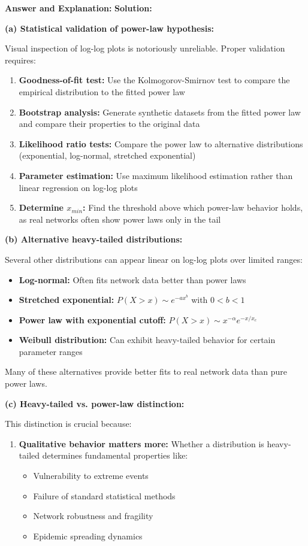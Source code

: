 \documentclass[11pt]{article}
\newenvironment{answer}{\color{answercolor}\begin{framed}\textbf{Answer and Explanation:}}{\end{framed}}
\begin{document}
\begin{answer}
\textbf{Solution:}

\textbf{(a) Statistical validation of power-law hypothesis:}

Visual inspection of log-log plots is notoriously unreliable. Proper validation requires:

\begin{enumerate}
    \item \textbf{Goodness-of-fit test:} Use the Kolmogorov-Smirnov test to compare the empirical distribution to the fitted power law
    \item \textbf{Bootstrap analysis:} Generate synthetic datasets from the fitted power law and compare their properties to the original data
    \item \textbf{Likelihood ratio tests:} Compare the power law to alternative distributions (exponential, log-normal, stretched exponential)
    \item \textbf{Parameter estimation:} Use maximum likelihood estimation rather than linear regression on log-log plots
    \item \textbf{Determine $x_{min}$:} Find the threshold above which power-law behavior holds, as real networks often show power laws only in the tail
\end{enumerate}

\textbf{(b) Alternative heavy-tailed distributions:}

Several other distributions can appear linear on log-log plots over limited ranges:
\begin{itemize}
    \item \textbf{Log-normal:} Often fits network data better than power laws
    \item \textbf{Stretched exponential:} $P(X > x) \sim e^{-ax^b}$ with $0 < b < 1$
    \item \textbf{Power law with exponential cutoff:} $P(X > x) \sim x^{-\alpha}e^{-x/x_c}$
    \item \textbf{Weibull distribution:} Can exhibit heavy-tailed behavior for certain parameter ranges
\end{itemize}

Many of these alternatives provide better fits to real network data than pure power laws.

\textbf{(c) Heavy-tailed vs. power-law distinction:}

This distinction is crucial because:

\begin{enumerate}
    \item \textbf{Qualitative behavior matters more:} Whether a distribution is heavy-tailed determines fundamental properties like:
    \begin{itemize}
        \item Vulnerability to extreme events
        \item Failure of standard statistical methods
        \item Network robustness and fragility
        \item Epidemic spreading dynamics
    \end{itemize}
    

\end{enumerate}
\end{answer}
\end{document}
